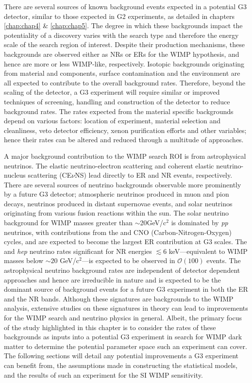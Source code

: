 There are several sources of known background events expected in a potential G3 detector, similar to those expected in G2 experiments, as detailed in chapters \ref{chap:chap4} \& \ref{chap:chap5}. The degree in which these backgrounds impact the potentiality of a discovery varies with the search type and therefore the energy scale of the search region of interest. Despite their production mechanisms, these backgrounds are observed either as NRs or ERs for the WIMP hypothesis, and hence are more or less WIMP-like, respectively. Isotopic backgrounds originating from material and components, surface contamination and the environment are all expected to contribute to the overall background rates. Therefore, beyond the scaling of the detector, a G3 experiment will require similar or improved techniques of screening, handling and construction of the detector to reduce background rates. The rates expected from the material specific backgrounds depend on various factors: location of experiment, material selection and cleanliness, veto detector efficiency, xenon purification efforts and other variables; hence their rates can be altered and reduced through a multitude of approaches.

A major background contribution to the WIMP search ROI is from astrophysical neutrinos. The elastic neutrino-electron scattering \cite{HASERT1973138} and coherent elastic neutrino-nucleus scattering (CE$\nu$NS) \cite{Akimov_2017} lead directly to ER and NR events, respectively. There are several sources of neutrino backgrounds observable more prominently by a future G3 detector; atmospheric neutrinos produced in muon and pion decays, neutrinos produced in distant supernovae events, and solar neutrinos originating from various fusion reactions within the sun. The solar neutrino background for WIMP masses greater than $\sim$20GeV/c$^{2}$ is dominated by \textit{pp} neutrinos, with contributions from the \BeS{} and CNO (Carbon-Nitrogen-Oxygen) cycles, and are expected to become the largest ER contribution at G3 scales. The \BE{} and \textit{hep} neutrino rates significant for NR energies $\lesssim 6$ keV---equivalent to WIMP masses below $\sim20$ GeV/c$^{2}$---is expected to be observed in $\mathcal{O}(100)$ events. The astrophysical neutrino background rates are independent of detector dependent approaches and hence are irreducible in nature and is expected to be the dominant source of background events for a future G3 experiment in both the ER and the NR bands. Although these signatures are backgrounds to the WIMP analysis, extensive studies on these signatures in theory can lead to improvements for the WIMP search and neutrino physics in general. Albeit, the primary focus of the study highlighted in this chapter is to consider the rates of these backgrounds as inputs into a potential G3 experiment in search for WIMP dark matter to determine the potential parameter space such an experiment can cover. The following sections will detail any potential improvements a G3 experiment can benefit from, the assumptions made in constructing the statistical models, and the results of such an experiment for the SI WIMP sensitivity. 


